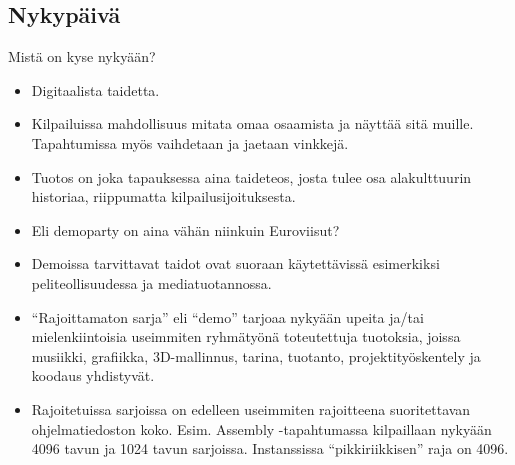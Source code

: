 \documentclass[pdf,10pt]{beamer}
\begin{document}
\subsection{Nykypäivä}
\begin{frame}{Mistä on kyse nykyään?}
  \begin{itemize}
  \item Digitaalista taidetta.
  \item Kilpailuissa mahdollisuus mitata omaa osaamista ja näyttää
    sitä muille. Tapahtumissa myös vaihdetaan ja jaetaan vinkkejä.
  \item Tuotos on joka tapauksessa aina taideteos, josta tulee osa
    alakulttuurin historiaa, riippumatta kilpailusijoituksesta.
  \item Eli demoparty on aina vähän niinkuin Euroviisut?
  \item Demoissa tarvittavat taidot ovat suoraan käytettävissä
    esimerkiksi peliteollisuudessa ja mediatuotannossa.
  \item ``Rajoittamaton sarja'' eli ``demo'' tarjoaa nykyään upeita
    ja/tai mielenkiintoisia useimmiten ryhmätyönä toteutettuja
    tuotoksia, joissa musiikki, grafiikka, 3D-mallinnus, tarina,
    tuotanto, projektityöskentely ja koodaus yhdistyvät.
  \item Rajoitetuissa sarjoissa on edelleen useimmiten rajoitteena
    suoritettavan ohjelmatiedoston koko. Esim. Assembly -tapahtumassa
    kilpaillaan nykyään 4096 tavun ja 1024 tavun
    sarjoissa. Instanssissa ``pikkiriikkisen'' raja on 4096.
  \end{itemize}
\end{frame}
\end{document}
